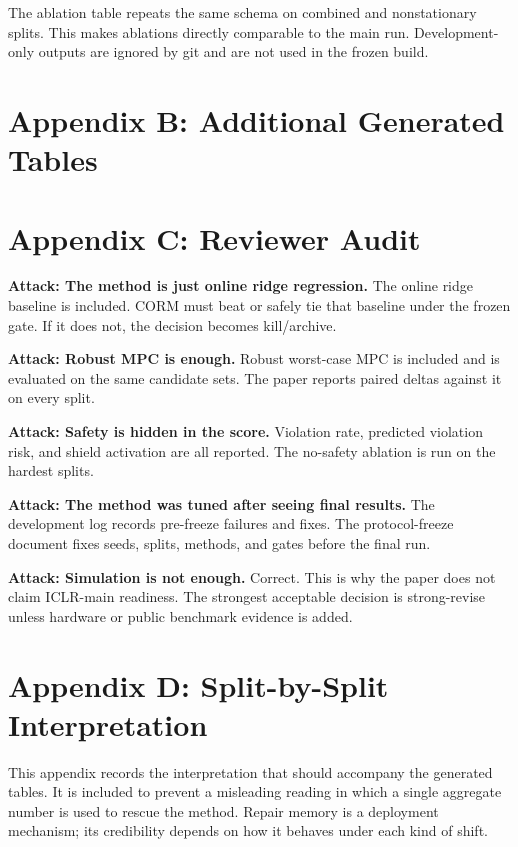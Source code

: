 \documentclass{article}
\begin{document}
The ablation table repeats the same schema on combined and nonstationary splits. This makes ablations directly comparable to the main run. Development-only outputs are ignored by git and are not used in the frozen build.

\section*{Appendix B: Additional Generated Tables}


\section*{Appendix C: Reviewer Audit}

\textbf{Attack: The method is just online ridge regression.} The online ridge baseline is included. CORM must beat or safely tie that baseline under the frozen gate. If it does not, the decision becomes kill/archive.

\textbf{Attack: Robust MPC is enough.} Robust worst-case MPC is included and is evaluated on the same candidate sets. The paper reports paired deltas against it on every split.

\textbf{Attack: Safety is hidden in the score.} Violation rate, predicted violation risk, and shield activation are all reported. The no-safety ablation is run on the hardest splits.

\textbf{Attack: The method was tuned after seeing final results.} The development log records pre-freeze failures and fixes. The protocol-freeze document fixes seeds, splits, methods, and gates before the final run.

\textbf{Attack: Simulation is not enough.} Correct. This is why the paper does not claim ICLR-main readiness. The strongest acceptable decision is strong-revise unless hardware or public benchmark evidence is added.

\section*{Appendix D: Split-by-Split Interpretation}

This appendix records the interpretation that should accompany the generated tables. It is included to prevent a misleading reading in which a single aggregate number is used to rescue the method. Repair memory is a deployment mechanism; its credibility depends on how it behaves under each kind of shift.
\end{document}
